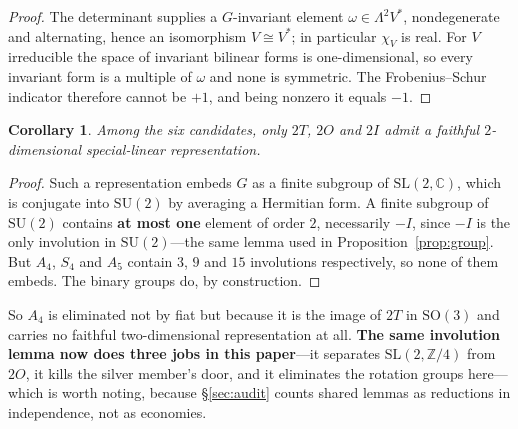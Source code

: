 \documentclass[11pt,reqno]{amsart}
\theoremstyle{plain}
\newtheorem{corollary}[theorem]{Corollary}
\theoremstyle{definition}
\theoremstyle{remark}
\newcommand{\Z}{\mathbb{Z}}
\newcommand{\C}{\mathbb{C}}
\newcommand{\SL}{\mathrm{SL}}
\newcommand{\SU}{\mathrm{SU}}
\begin{document}
\begin{proof}
The determinant supplies a $G$-invariant element $\omega\in\Lambda^2V^*$, nondegenerate
and alternating, hence an isomorphism $V\cong V^*$; in particular $\chi_V$ is real. For
$V$ irreducible the space of invariant bilinear forms is one-dimensional, so every
invariant form is a multiple of $\omega$ and none is symmetric. The Frobenius--Schur
indicator therefore cannot be $+1$, and being nonzero it equals $-1$.
\end{proof}

\begin{corollary}\label{cor:onlybinary}
Among the six candidates, only $2T$, $2O$ and $2I$ admit a faithful $2$-dimensional
special-linear representation.
\end{corollary}

\begin{proof}
Such a representation embeds $G$ as a finite subgroup of $\SL(2,\C)$, which is
conjugate into $\SU(2)$ by averaging a Hermitian form. A finite subgroup of $\SU(2)$
contains \textbf{at most one} element of order $2$, necessarily $-I$, since $-I$ is the
only involution in $\SU(2)$---the same lemma used in Proposition~\ref{prop:group}. But $A_4$, $S_4$ and $A_5$ contain $3$, $9$
and $15$ involutions respectively, so none of them embeds. The binary groups do, by
construction.
\end{proof}

\noindent So $A_4$ is eliminated not by fiat but because it is the image of $2T$ in
$\mathrm{SO}(3)$ and carries no faithful two-dimensional representation at all.
\textbf{The same involution lemma now does three jobs in this paper}---it separates
$\SL(2,\Z/4)$ from $2O$, it kills the silver member's door, and it eliminates the
rotation groups here---which is worth noting, because \S\ref{sec:audit} counts shared
lemmas as reductions in independence, not as economies.
\end{document}
